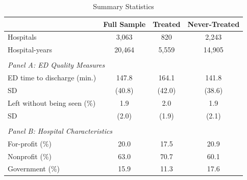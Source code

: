 \begin{table}[htbp]
\centering
\caption{Summary Statistics}
\label{tab:summary}
\begin{tabular}{lccc}
\hline\hline
 & Full Sample & Treated & Never-Treated \\
\hline
Hospitals & 3,063 & 820 & 2,243 \\
Hospital-years & 20,464 & 5,559 & 14,905 \\
\\[-4pt]
\multicolumn{4}{l}{\textit{Panel A: ED Quality Measures}} \\[2pt]
ED time to discharge (min.) & 147.8 & 164.1 & 141.8 \\
\quad SD & (40.8) & (42.0) & (38.6) \\
Left without being seen (\%) & 1.9 & 2.0 & 1.9 \\
\quad SD & (2.0) & (1.9) & (2.1) \\
\\[-4pt]
\multicolumn{4}{l}{\textit{Panel B: Hospital Characteristics}} \\[2pt]
For-profit (\%) & 20.0 & 17.5 & 20.9 \\
Nonprofit (\%) & 63.0 & 70.7 & 60.1 \\
Government (\%) & 15.9 & 11.3 & 17.6 \\
\hline\hline
\end{tabular}
\par{}
\end{table}
